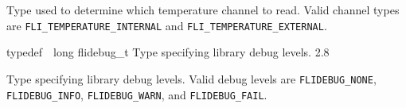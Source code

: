 \documentclass{article}
\begin{document}
\begin{cxxentry}
\begin{cxxentry}
\begin{cxxdoc}
Type used to determine which temperature channel to read.  Valid
channel types are \texttt{FLI\_TEMPERATURE\_INTERNAL} and
\texttt{FLI\_TEMPERATURE\_EXTERNAL}.


\end{cxxdoc}
\end{cxxentry}
\begin{cxxentry}
{typedef\ \ long}
        {flidebug\_t}
        {}
        { Type specifying library debug levels.}
        {2.8}
\begin{cxxdoc}

Type specifying library debug levels.  Valid debug levels are
\texttt{FLIDEBUG\_NONE}, \texttt{FLIDEBUG\_INFO},
\texttt{FLIDEBUG\_WARN}, and \texttt{FLIDEBUG\_FAIL}.


\end{cxxdoc}
\end{cxxentry}
\end{cxxentry}
\end{document}
